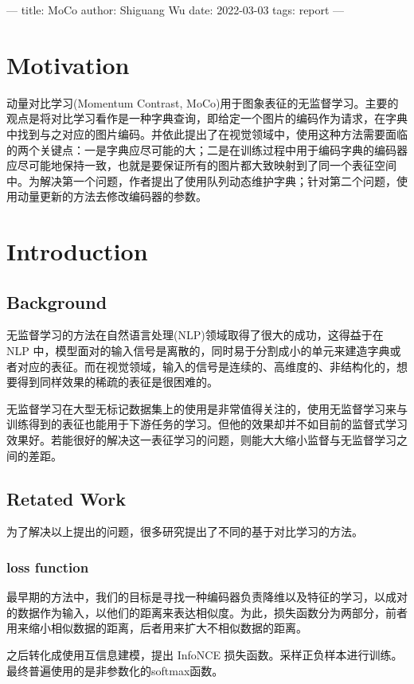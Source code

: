 ---
title: MoCo
author: Shiguang Wu
date: 2022-03-03
tags: report
---



\section{Motivation}

动量对比学习(Momentum Contrast, MoCo)用于图象表征的无监督学习。主要的观点是将对比学习看作是一种字典查询，即给定一个图片的编码作为请求，在字典中找到与之对应的图片编码。并依此提出了在视觉领域中，使用这种方法需要面临的两个关键点：一是字典应尽可能的大；二是在训练过程中用于编码字典的编码器应尽可能地保持一致，也就是要保证所有的图片都大致映射到了同一个表征空间中。为解决第一个问题，作者提出了使用队列动态维护字典；针对第二个问题，使用动量更新的方法去修改编码器的参数。

\section{Introduction}
\subsection{Background}
无监督学习的方法在自然语言处理(NLP)领域取得了很大的成功，这得益于在 NLP 中，模型面对的输入信号是离散的，同时易于分割成小的单元来建造字典或者对应的表征。而在视觉领域，输入的信号是连续的、高维度的、非结构化的，想要得到同样效果的稀疏的表征是很困难的。

无监督学习在大型无标记数据集上的使用是非常值得关注的，使用无监督学习来与训练得到的表征也能用于下游任务的学习。但他的效果却并不如目前的监督式学习效果好。若能很好的解决这一表征学习的问题，则能大大缩小监督与无监督学习之间的差距。

\subsection{Retated Work}

为了解决以上提出的问题，很多研究提出了不同的基于对比学习的方法。
\subsubsection{loss function}
最早期的方法中，我们的目标是寻找一种编码器负责降维以及特征的学习，以成对的数据作为输入，以他们的距离来表达相似度。为此，损失函数分为两部分，前者用来缩小相似数据的距离，后者用来扩大不相似数据的距离。

之后转化成使用互信息建模，提出 InfoNCE 损失函数。采样正负样本进行训练。最终普遍使用的是非参数化的softmax函数。

